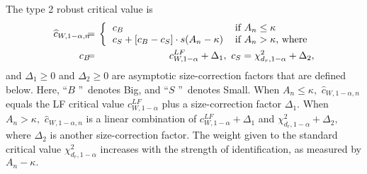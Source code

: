 \documentclass[12pt,titlepage,final,oneside,letterpaper]{article}
\begin{document}
The type 2 robust critical value is%
\begin{eqnarray}
\widehat{c}_{W,1-\alpha ,n}\hspace{-0.08in} &=&\hspace{-0.08in}\left\{ 
\begin{tabular}{ll}
$c_{B}$ & $\text{if }A_{n}\leq \kappa $ \\ 
$c_{S}+[c_{B}-c_{S}]\cdot s(A_{n}-\kappa )$ & $\text{if }A_{n}>\kappa ,$
where%
\end{tabular}%
\right.  \notag \\
c_{B}\hspace{-0.08in} &=&\hspace{-0.08in}c_{W,1-\alpha }^{LF}+\Delta _{1},%
\text{ }c_{S}=\chi _{d_{r},1-\alpha }^{2}+\Delta _{2},
\label{type 2 robust cv}
\end{eqnarray}%
and $\Delta _{1}\geq 0$ and $\Delta _{2}\geq 0$ are asymptotic
size-correction factors that are defined below. Here, \textquotedblleft $B$%
\textquotedblright\ denotes Big, and \textquotedblleft $S$%
\textquotedblright\ denotes Small. When $A_{n}\leq \kappa ,$ $\widehat{c}%
_{W,1-\alpha ,n}$ equals the LF critical value $c_{W,1-\alpha }^{LF}$ plus a
size-correction factor $\Delta _{1}.$ When $A_{n}>\kappa ,$ $\widehat{c}%
_{W,1-\alpha ,n}$ is a linear combination of $c_{W,1-\alpha }^{LF}+\Delta
_{1}$ and $\chi _{d_{r},1-\alpha }^{2}+\Delta _{2},$ where $\Delta _{2}$ is
another size-correction factor. The weight given to the standard critical
value $\chi _{d_{r},1-\alpha }^{2}$ increases with the strength of
identification, as measured by $A_{n}-\kappa .$
\end{document}
